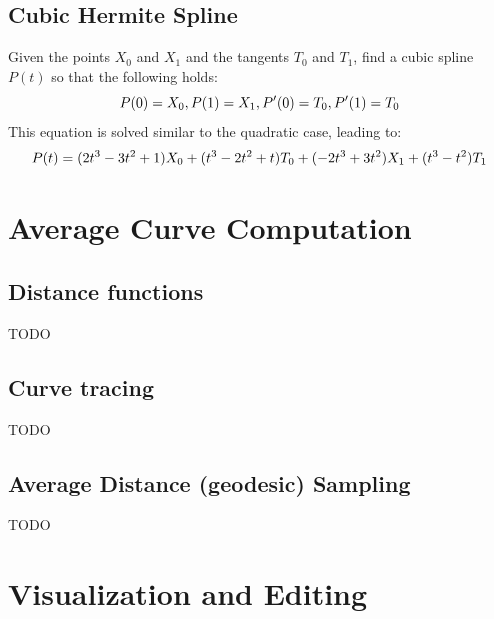 \documentclass[journal, letterpaper]{IEEEtran}
\begin{document}
\subsection{Cubic Hermite Spline}
Given the points $X_0$ and $X_1$ and the tangents $T_0$ and $T_1$, find a cubic spline $P(t)$ so that the following holds:
\begin{equation}
\small
 P(0)=X_0, P(1)=X_1, P'(0)=T_0, P'(1)=T_0
\end{equation}
This equation is solved similar to the quadratic case, leading to:
\begin{equation}
\small
 P(t) = (2t^3-3t^2+1)X_0 + (t^3-2t^2+t)T_0 + (-2t^3+3t^2)X_1 + (t^3-t^2)T_1
\label{eq:CubicHermite}
\end{equation}

\section{Average Curve Computation}

\subsection{Distance functions}
TODO

\subsection{Curve tracing}
TODO

\subsection{Average Distance (geodesic) Sampling}
TODO

\section{Visualization and Editing}
\end{document}

